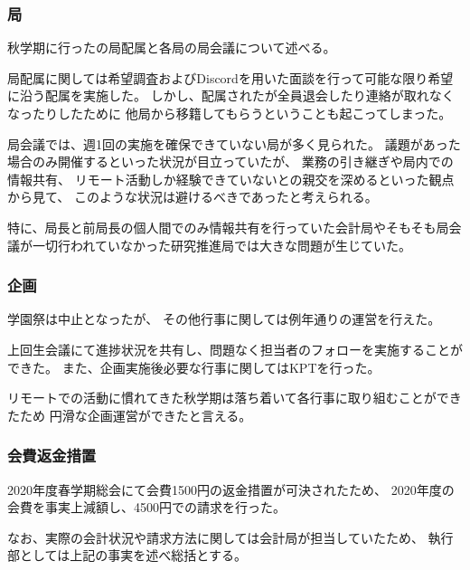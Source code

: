 \subsubsection*{局}
秋学期に行った\firstGrade{}の局配属と各局の局会議について述べる。

局配属に関しては希望調査およびDiscordを用いた面談を行って可能な限り希望に沿う配属を実施した。
しかし、配属された\firstGrade{}が全員退会したり連絡が取れなくなったりしたために
他局から移籍してもらうということも起こってしまった。

局会議では、週1回の実施を確保できていない局が多く見られた。
議題があった場合のみ開催するといった状況が目立っていたが、
業務の引き継ぎや局内での情報共有、
リモート活動しか経験できていない\firstGrade{}との親交を深めるといった観点から見て、
このような状況は避けるべきであったと考えられる。

特に、局長と前局長の個人間でのみ情報共有を行っていた会計局やそもそも局会議が一切行われていなかった研究推進局では大きな問題が生じていた。

\subsubsection*{企画}
学園祭は中止となったが、
その他行事に関しては例年通りの運営を行えた。

上回生会議にて進捗状況を共有し、問題なく担当者のフォローを実施することができた。
また、企画実施後必要な行事に関してはKPTを行った。

リモートでの活動に慣れてきた秋学期は落ち着いて各行事に取り組むことができたため
円滑な企画運営ができたと言える。

\subsubsection*{会費返金措置}
2020年度春学期総会にて会費1500円の返金措置が可決されたため、
2020年度の会費を事実上減額し、4500円での請求を行った。

なお、実際の会計状況や請求方法に関しては会計局が担当していたため、
執行部としては上記の事実を述べ総括とする。

